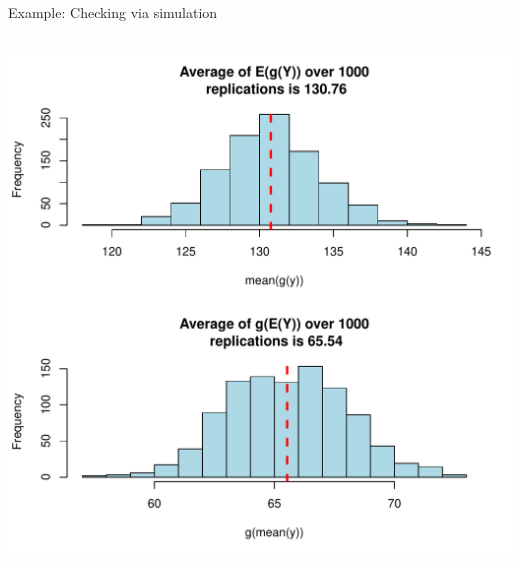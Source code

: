 \documentclass[10pt]{beamer}\usepackage[]{graphicx}\usepackage[]{color}
\makeatletter
\def\maxwidth{ %
  \ifdim\Gin@nat@width>\linewidth
    \linewidth
  \else
    \Gin@nat@width
  \fi
}
\newenvironment{knitrout}{}{} %
\makeatother
\begin{document}
\begin{frame}[fragile]{Example: Checking via simulation}
\begin{columns}
\begin{column}{0.5\textwidth}
\begin{knitrout}
{\centering \includegraphics[width=\maxwidth]{figure/unnamed-chunk-16-1} 

}


\end{knitrout}
		\end{column}
	\end{columns}
\end{frame}
\end{document}
